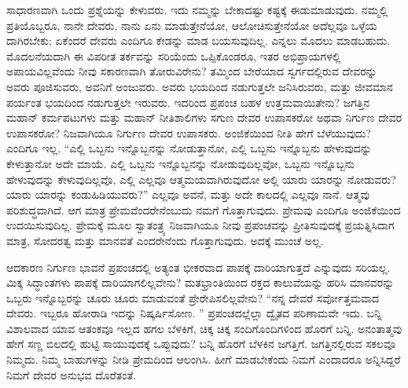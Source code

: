 \vskip 6pt

ಸಾಧಾರಣವಾಗಿ ಒಂದು ಪ್ರಶ್ನೆಯನ್ನು ಕೇಳುವರು. ಇದು ನಮ್ಮನ್ನು ಬೇಕಾದಷ್ಟು ಕಷ್ಟಕ್ಕೆ ಈಡುಮಾಡುವುದು. ನಮ್ಮಲ್ಲಿ ಪ್ರತಿಯೊಬ್ಬರೂ, ನಾನೇ ದೇವರು, ನಾನು ಏನು ಮಾಡುತ್ತೇನೆಯೋ, ಆಲೋಚಿಸುತ್ತೇನೆಯೋ ಅದೆಲ್ಲವೂ ಒಳ್ಳೆಯ ದಾಗಿರಬೇಕು; ಏಕೆಂದರೆ ದೇವರು ಎಂದಿಗೂ ಕೇಡನ್ನು ಮಾಡ ಬಯಸುವುದಿಲ್ಲ. ಎನ್ನಲು ಮೊದಲು ಮಾಡಬಹುದು. ಮೊದಲನೆಯದಾಗಿ ಈ ವಿಪರೀತ ತರ್ಕವನ್ನು ಸರಿಯೆಂದು ಒಪ್ಪಿಕೊಂಡರೂ, ಇತರ ಅಭಿಪ್ರಾಯಗಳಲ್ಲಿ ಅಪಾಯವಿಲ್ಲವೆಂದು ನೀವು ಸಕಾರಣವಾಗಿ ತೋರುವಿರೇನು? ತಮ್ಮಿಂದ ಬೇರೆಯಾದ ಸ್ವರ್ಗದಲ್ಲಿರುವ ದೇವರನ್ನು ಅವರು ಪೂಜಿಸುವರು, ಅವನಿಗೆ ಅಂಜುವರು. ಅವರು ಭಯದಿಂದ ನಡುಗುತ್ತಲೇ ಜನಿಸಿರುವರು, ಮತ್ತು ಜೀವಮಾನ ಪರ್ಯಂತ ಭಯದಿಂದ ನಡುಗುತ್ತಲೇ ಇರುವರು. ಇದರಿಂದ ಪ್ರಪಂಚ ಬಹಳ ಉತ್ತಮವಾಯಿತೇನು? ಜಗತ್ತಿನ ಮಹಾನ್​ ಕರ್ಮಪಟುಗಳು ಮತ್ತು ಮಹಾನ್​ ನೀತಿಶಾಲಿಗಳು ಸಗುಣ ದೇವರ ಉಪಾಸಕರೋ ಅಥವಾ ನಿರ್ಗುಣ ದೇವರ ಉಪಾಸಕರೋ? ನಿಜವಾಗಿಯೂ ನಿರ್ಗುಣ ದೇವರ ಉಪಾಸಕರು. ಅಂಜಿಕೆಯಿಂದ ನೀತಿ ಹೇಗೆ ಬೆಳೆಯುವುದು? ಎಂದಿಗೂ ಇಲ್ಲ. “ಎಲ್ಲಿ ಒಬ್ಬನು ಇನ್ನೊಬ್ಬನನ್ನು ನೋಡುತ್ತಾನೋ, ಎಲ್ಲಿ ಒಬ್ಬನು ಇನ್ನೊಬ್ಬನು ಹೇಳುವುದನ್ನು ಕೇಳುತ್ತಾನೋ ಅದೇ ಮಾಯೆ. ಎಲ್ಲಿ ಒಬ್ಬನು ಇನ್ನೊಬ್ಬನನ್ನು ನೋಡುವುದಿಲ್ಲವೋ, ಒಬ್ಬನು ಇನ್ನೊಬ್ಬನು ಹೇಳುವುದನ್ನು ಕೇಳುವುದಿಲ್ಲವೊ, ಎಲ್ಲಿ ಎಲ್ಲವೂ ಆತ್ಮಮಯವಾಗಿರುವುದೋ ಅಲ್ಲಿ ಯಾರು ಯಾರನ್ನು ನೋಡುವರು? ಯಾರು ಯಾರನ್ನು ಕಂಡುಹಿಡಿಯುವರು?” ಎಲ್ಲವೂ ಅವನೆ, ಮತ್ತು ಅದೇ ಕಾಲದಲ್ಲಿ ಎಲ್ಲವೂ ನಾನೆ. ಆತ್ಮವು ಪರಿಶುದ್ಧವಾಗಿದೆ. ಆಗ ಮಾತ್ರ ಪ್ರೇಮವೆಂದರೇನೆಂಬುದು ನಮಗೆ ಗೊತ್ತಾಗುವುದು. ಪ್ರೇಮವು ಎಂದಿಗೂ ಅಂಜಿಕೆಯಿಂದ ಉದಯಿಸುವುದಿಲ್ಲ. ಪ್ರೇಮಕ್ಕೆ ಮೂಲ ಸ್ವಾತಂತ್ರ್ಯ ನಿಜವಾಗಿಯೂ ನೀವು ಪ್ರಪಂಚವನ್ನು ಪ್ರೀತಿಸುವುದಕ್ಕೆ ಪ್ರಯತ್ನಿಸಿದಾಗ ಮಾತ್ರ, ಸೋದರತ್ವ ಮತ್ತು ಮಾನವತೆ ಎಂದರೇನೆಂದು ಗೊತ್ತಾಗುವುದು. ಅದಕ್ಕೆ ಮುಂಚೆ ಅಲ್ಲ. 

\vskip 6pt

ಆದಕಾರಣ ನಿರ್ಗುಣ ಭಾವನೆ ಪ್ರಪಂಚದಲ್ಲಿ ಅತ್ಯಂತ ಭೀಕರವಾದ ಪಾಪಕ್ಕೆ ದಾರಿಯಾಗುತ್ತದೆ ಎನ್ನುವುದು ಸರಿಯಲ್ಲ. ಮಿಕ್ಕ ಸಿದ್ಧಾಂತಗಳು ಪಾಪಕ್ಕೆ ದಾರಿಯಾಗಲಿಲ್ಲವೇನು? ಮತಭ್ರಾಂತಿಯಿಂದ ರಕ್ತದ ಕಾಲುವೆಯನ್ನು ಹರಿಸಿ ಮಾನವರನ್ನು ಒಬ್ಬರು ಇನ್ನೊಬ್ಬರನ್ನು ಚೂರು ಚೂರು ಮಾಡುವಂತೆ ಪ್ರೇರೇಪಿಸಲಿಲ್ಲವೇನು? “ನನ್ನ ದೇವರೆ ಸರ್ವೋತ್ತಮವಾದ ದೇವರು. ಇಬ್ಬರೂ ಹೋರಾಡಿ ಇದನ್ನು ನಿಷ್ಕರ್ಷಿಸೋಣ. ” ಪ್ರಪಂಚದಲ್ಲೆಲ್ಲಾ ದ್ವೈತದ ಪರಿಣಾಮವೇ ಇದು. ಬನ್ನಿ ವಿಶಾಲವಾದ ಯಾವ ಆತಂಕವೂ ಇಲ್ಲದ ಹಗಲ ಬೆಳಕಿಗೆ, ಚಿಕ್ಕ ಚಿಕ್ಕ ಸಂದಿಗೊಂದಿಗಳಿಂದ ಹೊರಗೆ ಬನ್ನಿ. ಅನಂತಾತ್ಮವು ಹೇಗೆ ಸಣ್ಣ ಬಿಲದಲ್ಲಿ ಹುಟ್ಟಿ ಸಾಯುವುದಕ್ಕೆ ಒಪ್ಪುವುದು? ಬನ್ನಿ ಹೊರಗೆ ಬೆಳಕಿನ ಜಗತ್ತಿಗೆ. ಜಗತ್ತಿನಲ್ಲಿರುವ ಸಕಲವೂ ನಿಮ್ಮದು. ನಿಮ್ಮ ಬಾಹುಗಳನ್ನು ನೀಡಿ ಪ್ರೇಮದಿಂದ ಆಲಂಗಿಸಿ. ಹೀಗೆ ಮಾಡಬೇಕೆಂದು ನಿಮಗೆ ಎಂದಾದರೂ ಅನ್ನಿಸಿದ್ದರೆ ನಿಮಗೆ ದೇವರ ಅನುಭವ ದೊರೆತಂತೆ. 

\vskip 6pt

